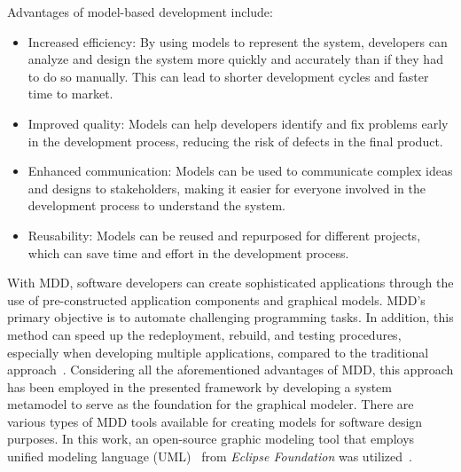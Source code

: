 	Advantages of model-based development include:
    \begin{itemize}
        \item Increased efficiency: By using models to represent the system, developers can analyze and design the system more quickly and accurately than if they had to do so manually. This can lead to shorter development cycles and faster time to market.
        \item Improved quality: Models can help developers identify and fix problems early in the development process, reducing the risk of defects in the final product.
        \item Enhanced communication: Models can be used to communicate complex ideas and designs to stakeholders, making it easier for everyone involved in the development process to understand the system.
        \item Reusability: Models can be reused and repurposed for different projects, which can save time and effort in the development process.
    \end{itemize}
	With MDD, software developers can create sophisticated applications through the use of pre-constructed application components and graphical models. MDD's primary objective is to automate challenging programming tasks. In addition, this method can speed up the redeployment, rebuild, and testing procedures, especially when developing multiple applications, compared to the traditional approach~\cite{atkinson2003model}. 
    Considering all the aforementioned advantages of MDD, this approach has been employed in the presented framework by developing a system metamodel to serve as the foundation for the graphical modeler.
    There are various types of MDD tools available for creating models for software design purposes. In this work, an open-source graphic modeling tool that employs unified modeling language (UML)~\cite{medvidovic2002modeling} from \textit{Eclipse Foundation} was utilized~\cite{9565115,askaripoor2023designer, eclipse}. 
    

	

